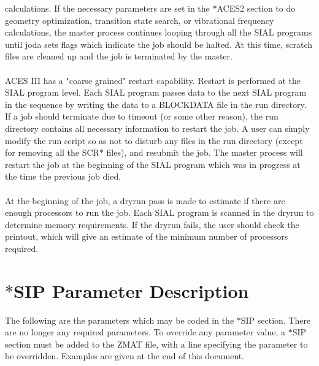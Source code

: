 \documentclass[12pt]{article}
\begin{document}
calculations.  If the necessary parameters are set in the $*$ACES2 section to do geometry 
optimization, transition state search, or vibrational frequency calculations, the master 
process continues looping through all the SIAL programs until joda sets flags which indicate 
the job should be halted.  At this time, scratch files are cleaned up and the job is 
terminated by the master.\\ 
\\ 
ACES III has a "coarse grained" restart capability.  Restart is performed at the SIAL 
program level. Each SIAL program passes data to the next SIAL program in the sequence by 
writing the data to a BLOCKDATA file in the run directory.  If a job should terminate due 
to timeout (or some other reason), the run directory contains all necessary information to 
restart the job.  A user can simply modify the run script so as not to disturb any files 
in the run directory (except for removing all the SCR$*$ files), and resubmit the job. 
The master process will restart the job at the beginning of the SIAL program which was in 
progress at the time the previous job died. \\  
\\ 
At the beginning of the job, a dryrun pass is made to estimate if there are enough processors 
to run the job.  Each SIAL program is scanned in the dryrun to determine memory requirements. 
If the dryrun fails, the user should check the printout, which will give an estimate of the 
minimum number of processors required. 

\section{\Large \bf $*$SIP Parameter Description}

The following are the parameters which may be coded in the $*$SIP section. There are no longer 
any required parameters. To override any parameter value, a $*$SIP section must be added to the 
ZMAT file, with a line specifying the parameter to be overridden. Examples are given at the 
end of this document.  
\end{document}
